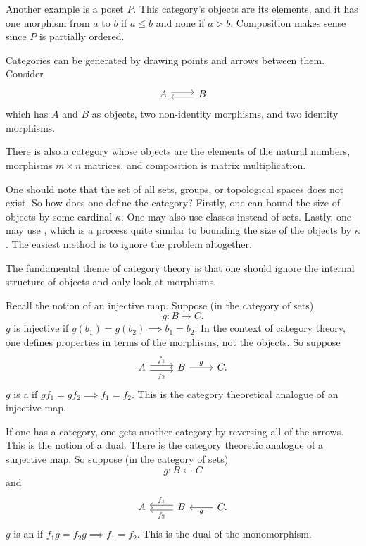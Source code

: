 \documentclass[11pt, oneside]{article}
\begin{document}
Another example is a poset $P$. \iffalse satisfying $a\leq a$ and 
$$
(a\leqslant b \land b\leqslant c) \implies a\leqslant c.
$$\fi
This category's objects are its elements, and it has one morphism from $a$ to $b$ if $a\leq b$ and none if $a>b$. Composition makes sense since $P$ is partially ordered.

Categories can be generated by drawing points and arrows between them. Consider 
\[
\begin{tikzcd}
A \arrow[r, shift left, ]& B\arrow[l, shift left, ]
\end{tikzcd}
\]
which has $A$ and $B$ as objects, two non-identity morphisms, and two identity morphisms.

There is also a category whose objects are the elements of the natural numbers, morphisms $m\times n$ matrices, and composition is matrix multiplication.

One should note that the set of all sets, groups, or topological spaces does not exist. So how does one define the category? Firstly, one can bound the size of objects by some cardinal $\kappa$. One may also use classes instead of sets. Lastly, one may use \href{https://en.wikipedia.org/wiki/Grothendieck_universe}{}, which is a process quite similar to bounding the size of the objects by $\kappa$. The easiest method is to ignore the problem altogether.

The fundamental theme of category theory is that one should ignore the internal structure of objects and only look at morphisms.

Recall the notion of an injective map. Suppose (in the category of sets)
$$
g : B\longrightarrow C.
$$
$g$ is injective if $g(b_1) = g(b_2) \implies b_1=b_2$. In the context of category theory, one defines properties in terms of the morphisms, not the objects. So suppose 
\[
\begin{tikzcd}
A \arrow[r, shift right, swap, "f_2"] \arrow[r, shift left, "f_1"]& B \arrow[r, "g"] & C.
\end{tikzcd}
\]
$g$ is a \href{https://en.wikipedia.org/wiki/Monomorphism}{} if $gf_1 = gf_2 \implies f_1=f_2$. This is the category theoretical analogue of an injective map.

If one has a category, one gets another category by reversing all of the arrows. This is the notion of a dual. There is the category theoretic analogue of a surjective map. So suppose (in the category of sets)
$$
g : B\longleftarrow C
$$
and
\[
\begin{tikzcd}
A & B\arrow[l, shift right, swap, "f_1"] \arrow[l, shift left, "f_2"] & C \arrow[l, "g"].
\end{tikzcd}
\]
$g$ is an \href{https://en.wikipedia.org/wiki/Epimorphism}{} if $f_1g = f_2g \implies f_1=f_2$. This is the dual of the monomorphism.
\end{document}
